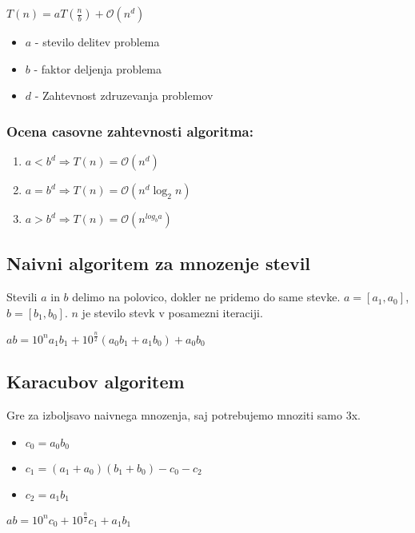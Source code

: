 \documentclass{article}
\begin{document}
\begin{multicols}{2}
\begin{center}
    \begin{math}
        T(n) = a T(\frac{n}{b}) + \mathcal{O}(n^d)
    \end{math}
\end{center}

\begin{itemize}
    \item $a$ - stevilo delitev problema
    \item $b$ - faktor deljenja problema
    \item $d$ - Zahtevnost zdruzevanja problemov 
\end{itemize}

\subsubsection{Ocena casovne zahtevnosti algoritma:}
\begin{enumerate}
    \item $a < b^d \Rightarrow T(n) = \mathcal{O}(n^d)$
    \item $a = b^d \Rightarrow T(n) = \mathcal{O}(n^d \log_2 n)$
    \item $a > b^d \Rightarrow T(n) = \mathcal{O}(n^{log_b a})$
\end{enumerate}

\subsection{Naivni algoritem za mnozenje stevil}
Stevili $a$ in $b$ delimo na polovico, dokler ne pridemo do same stevke.
$a = [a_1, a_0]$, $b =[b_1, b_0]$. $n$ je stevilo stevk v posamezni iteraciji.

\begin{center}
    \begin{math}
        ab = 10^n a_1 b_1 + 10^{\frac{n}{2}}(a_0 b_1 + a_1 b_0) + a_0 b_0
    \end{math}
\end{center}

\subsection{Karacubov algoritem}
Gre za izboljsavo naivnega mnozenja, saj potrebujemo mnoziti samo 3x.
\begin{itemize}
    \item $c_0 = a_0 b_0$
    \item $c_1 = (a_1 + a_0) (b_1 + b_0) - c_0 - c_2$
    \item $c_2 = a_1 b_1$
\end{itemize}

\begin{center}
    \begin{math}
        ab = 10^n c_0 + 10^{\frac{n}{2}} c_1 + a_1 b_1
    \end{math}
\end{center}


\end{multicols}
\end{document}
